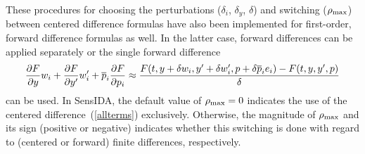These procedures for choosing the perturbations ($\delta_i$,
$\delta_y$, $\delta$) and switching ($\rho_{\max}$) between centered
difference formulas have also been implemented for first-order,
forward difference formulas as well.
In the latter case, forward differences can be applied separately or
the single forward difference
\begin{equation}
\frac{\partial F}{\partial y} w_i + \frac{\partial F}{\partial y^{\prime}} w^{\prime}_i + 
\overline{p}_i \frac{\partial F}{\partial p_i} \approx
\frac{F(t,y+\delta w_i, y^{\prime}+\delta w^{\prime}_i, p + \delta \overline{p}_i e_i)-
F(t,y,y^{\prime},p)}{\delta}
\label{switching}
\end{equation}
can be used.
In SensIDA, the default value of $\rho_{\max}=0$ indicates the use of
the centered difference~(\ref{allterms}) exclusively.
Otherwise, the magnitude of $\rho_{\max}$ and its sign (positive or
negative) indicates whether this switching is done with regard to
(centered or forward) finite differences, respectively.

